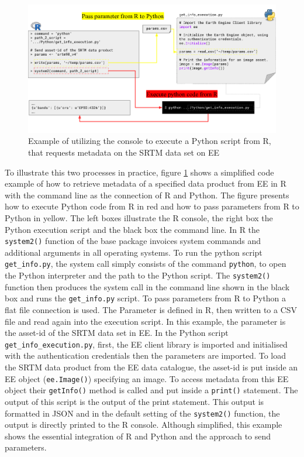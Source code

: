 \begin{center}
	\begin{figure}[h]
		\begin{center}
			\includegraphics[width=15cm]{images/concole_connection-cropped.pdf}
			\caption{Example of utilizing the console to execute a Python script from R, that requests metadata on the SRTM data set on EE}
			\label{consoleConnection}			
		\end{center}
	\end{figure}
\end{center}


To illustrate this two processes in practice, figure \ref{consoleConnection} shows a simplified code example of how to retrieve metadata of a specified data product from EE in R with the command line as the connection of R and Python. The figure presents how to execute Python code from R in red and how to pass parameters from R to Python in yellow. The left boxes illustrate the R console, the right box the Python execution script and the black box the command line.
In R the \texttt{system2()} function of the base package invoices system commands and additional arguments in all operating systems. 
To run the python script \texttt{get\_info.py}, the system call simply consists of the command \texttt{python}, to open the Python interpreter and the path to the Python script. The \texttt{system2()} function then produces the system call in the command line shown in the black box and runs the \texttt{get\_info.py} script. To pass parameters from R to Python a flat file connection is used. The Parameter is defined in R, then written to a CSV file and read again into the execution script. In this example, the parameter is the asset-id of the SRTM data set in EE. 
In the Python script \texttt{get\_info\_execution.py}, first, the EE client library is imported and initialised with the authentication credentials then the parameters are imported. To load the SRTM data product from the EE data catalogue, the asset-id is put inside an EE object (\texttt{ee.Image()}) specifying an image. To access metadata from this EE object their \texttt{getInfo()} method is called and put inside a \texttt{print()} statement. The output of this script is the output of the print statement. This output is formatted in JSON and in the default setting of the \texttt{system2()} function, the output is directly printed to the R console. Although simplified, this example shows the essential integration of R and Python and the approach to send parameters. 


